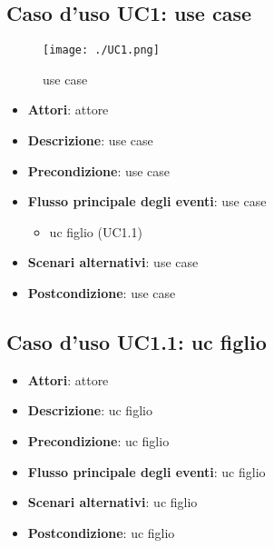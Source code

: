 \subsection{Caso d'uso \hypertarget{UC1}{UC1}: use case}
\begin{figure} [H]
\centering
\texttt{[image: ./UC1.png]}
\caption{use case}\label{}
\end{figure}
\begin{itemize}
\item \textbf{Attori}: attore
\item \textbf{Descrizione}: use case
\item \textbf{Precondizione}: use case
\item \textbf{Flusso principale degli eventi}: use case
\begin{itemize}
\item uc figlio (UC1.1)
\end{itemize}
\item \textbf{Scenari alternativi}: use case
\item \textbf{Postcondizione}: use case
\end{itemize}
\subsection{Caso d'uso \hypertarget{UC1.1}{UC1.1}: uc figlio}
\begin{itemize}
\item \textbf{Attori}: attore
\item \textbf{Descrizione}: uc figlio
\item \textbf{Precondizione}: uc figlio
\item \textbf{Flusso principale degli eventi}: uc figlio
\item \textbf{Scenari alternativi}: uc figlio
\item \textbf{Postcondizione}: uc figlio
\end{itemize}
